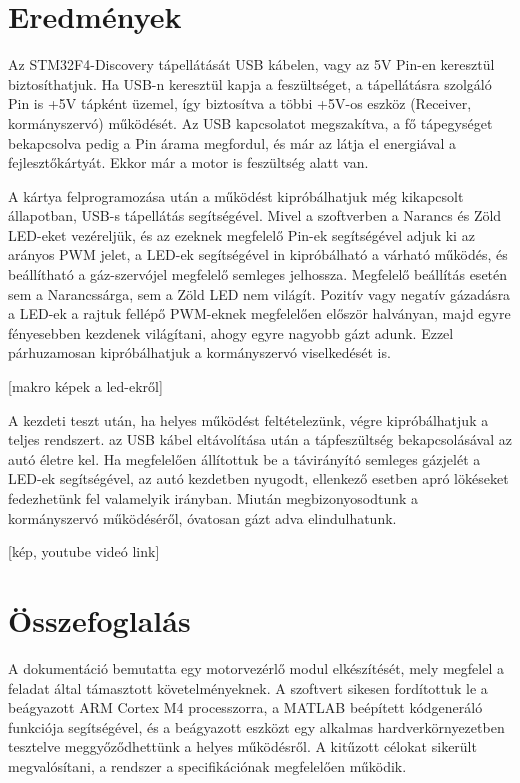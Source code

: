 \section{Eredmények}

Az STM32F4-Discovery tápellátását USB kábelen, vagy az 5V Pin-en keresztül biztosíthatjuk. Ha USB-n keresztül kapja a feszültséget, a tápellátásra szolgáló Pin is +5V tápként üzemel, így biztosítva a többi +5V-os eszköz (Receiver, kormányszervó) működését. Az USB kapcsolatot megszakítva, a fő tápegységet bekapcsolva pedig a Pin árama megfordul, és már az látja el energiával a fejlesztőkártyát. Ekkor már a motor is feszültség alatt van.

A kártya felprogramozása után a működést kipróbálhatjuk még kikapcsolt állapotban, USB-s tápellátás segítségével. Mivel a szoftverben a Narancs és Zöld LED-eket vezéreljük, és az ezeknek megfelelő Pin-ek segítségével adjuk ki az arányos PWM jelet, a LED-ek segítségével in kipróbálható a várható működés, és beállítható a gáz-szervójel megfelelő semleges jelhossza. Megfelelő beállítás esetén sem a Narancssárga, sem a Zöld LED nem világít. Pozitív vagy negatív gázadásra a LED-ek a rajtuk fellépő PWM-eknek megfelelően először halványan, majd egyre fényesebben kezdenek világítani, ahogy egyre nagyobb gázt adunk. Ezzel párhuzamosan kipróbálhatjuk a kormányszervó viselkedését is.

[makro képek a led-ekről]

A kezdeti teszt után, ha helyes működést feltételezünk, végre kipróbálhatjuk a teljes rendszert. az USB kábel eltávolítása után a tápfeszültség bekapcsolásával az autó életre kel. Ha megfelelően állítottuk be a távirányító semleges gázjelét a LED-ek segítségével, az autó kezdetben nyugodt, ellenkező esetben apró lökéseket fedezhetünk fel valamelyik irányban. Miután megbizonyosodtunk a kormányszervó működéséről, óvatosan gázt adva elindulhatunk.

[kép, youtube videó link]

\section{Összefoglalás}

A dokumentáció bemutatta egy motorvezérlő modul elkészítését, mely megfelel a feladat által támasztott követelményeknek. A szoftvert sikesen fordítottuk le a beágyazott ARM Cortex M4 processzorra, a MATLAB beépített kódgeneráló funkciója segítségével, és a beágyazott eszközt egy alkalmas hardverkörnyezetben tesztelve meggyőződhettünk a helyes működésről. A kitűzott célokat sikerült megvalósítani, a rendszer a specifikációnak megfelelően működik.